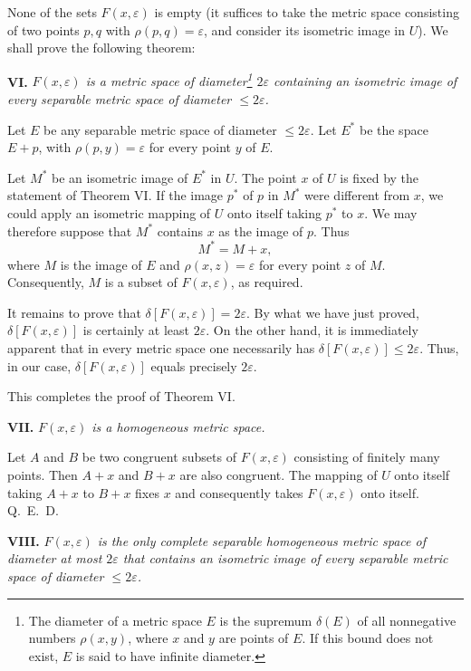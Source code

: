 \documentclass[a4paper,12pt]{amsart}
\newcommand{\srcpage}[1]{} %
\begin{document}
None of the sets $F(x,\varepsilon)$ is empty (it suffices to take the metric space consisting of two points $p,q$ with $\rho(p,q)=\varepsilon$, and consider its isometric image in $U$). We shall prove the following theorem:

\textbf{VI.} \textit{$F(x,\varepsilon)$ is a metric space of diameter\footnote{The diameter of a metric space $E$ is the supremum $\delta(E)$ of all nonnegative numbers $\rho(x,y)$, where $x$ and $y$ are points of $E$. If this bound does not exist, $E$ is said to have infinite diameter.} $2\varepsilon$ containing an isometric image of every separable metric space of diameter $\le2\varepsilon$.}

Let $E$ be any separable metric space of diameter $\le2\varepsilon$. Let $E^*$ be the space $E+p$, with $\rho(p,y)=\varepsilon$ for every point $y$ of $E$.

Let $M^*$ be an isometric image of $E^*$ in $U$. The point $x$ of $U$ is fixed by the statement of Theorem VI. If the image $p^*$ of $p$ in $M^*$ were different from $x$, we could apply an isometric mapping of $U$ onto itself taking $p^*$ to $x$. We may therefore suppose that $M^*$ contains $x$ as the image of $p$. Thus
\[M^*=M+x,\]
where $M$ is the image of $E$ and $\rho(x,z)=\varepsilon$ for every point $z$ of $M$. Consequently, $M$ is a subset of $F(x,\varepsilon)$, as required.

It remains to prove that $\delta[F(x,\varepsilon)]=2\varepsilon$. By what we have just proved, $\delta[F(x,\varepsilon)]$ is certainly at least $2\varepsilon$. On the other hand, it is immediately apparent that in every metric space one necessarily has $\delta[F(x,\varepsilon)]\le2\varepsilon$. Thus, in our case, $\delta[F(x,\varepsilon)]$ equals precisely $2\varepsilon$.
\srcpage{84}
This completes the proof of Theorem VI.

\textbf{VII.} \textit{$F(x,\varepsilon)$ is a homogeneous metric space.}

Let $A$ and $B$ be two congruent subsets of $F(x,\varepsilon)$ consisting of finitely many points. Then $A+x$ and $B+x$ are also congruent. The mapping of $U$ onto itself taking $A+x$ to $B+x$ fixes $x$ and consequently takes $F(x,\varepsilon)$ onto itself. \hfill \mbox{Q. E. D.}

\textbf{VIII.} \textit{$F(x,\varepsilon)$ is the only complete separable homogeneous metric space of diameter at most $2\varepsilon$ that contains an isometric image of every separable metric space of diameter $\le2\varepsilon$.}
\end{document}
